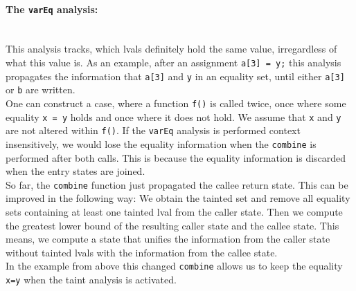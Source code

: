       \paragraph{The \texttt{varEq} analysis:}\mbox{}\\
        This analysis tracks, which \ac{lval}s definitely hold the same value, irregardless of what this value is. As an example, after an assignment \texttt{a[3] = y;} this analysis propagates the information that \texttt{a[3]} and \texttt{y} in an equality set, until either \texttt{a[3]} or \texttt{b} are written.\\
        One can construct a case, where a function \texttt{f()} is called twice, once where some equality \texttt{x = y} holds and once where it does not hold. We assume that \texttt{x} and \texttt{y} are not altered within \texttt{f()}. If the \texttt{varEq} analysis is performed context insensitively, we would lose the equality information when the \texttt{combine} is performed after both calls. This is because the equality information is discarded when the entry states are joined.\\
        So far, the \texttt{combine} function just propagated the callee return state. This can be improved in the following way: We obtain the tainted set and remove all equality sets containing at least one tainted \ac{lval} from the caller state. Then we compute the greatest lower bound of the resulting caller state and the callee state. This means, we compute a state that unifies the information from the caller state without tainted \ac{lval}s with the information from the callee state.\\
        In the example from above this changed \texttt{combine} allows us to keep the equality \texttt{x=y} when the taint analysis is activated.

